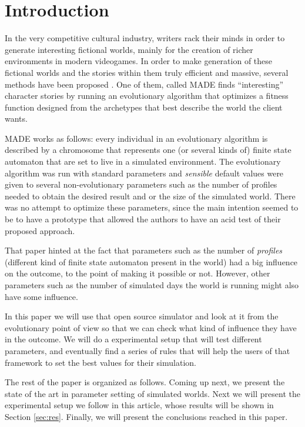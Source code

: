 \documentclass[runningheads,a4paper]{llncs}
\begin{document}
\section{Introduction}

In the very competitive cultural industry, writers rack their minds in
order to generate interesting fictional worlds, mainly for the
creation of richer environments in modern videogames. In order to make
generation of these fictional worlds and the stories within them truly efficient and massive,
several methods have been proposed \cite{garcia14my,nairat:evolution}. One of them, called MADE
\cite{garcia14my} finds ``interesting'' character stories by running
an evolutionary algorithm that optimizes a fitness function designed
from the archetypes that best describe the world the client wants.

MADE works as follows: every individual in an evolutionary algorithm
is described by a chromosome that represents one (or several kinds of)
finite state automaton that are set to live in a simulated
environment. The evolutionary algorithm was run with standard
parameters and {\em sensible} default values were given to several
non-evolutionary parameters such as the number of profiles needed to
obtain the desired result and or the size of the simulated
world. There was no attempt to optimize these parameters, since the
main intention seemed to be to have a prototype that allowed the
authors to have an acid test of their proposed approach.

That paper hinted at the fact that parameters such as the number of
{\em profiles} (different kind of finite state automaton present in
the world) had a big influence on the outcome, to the point of making
it possible or not. However, other parameters such as the number of
simulated days the world is running might also have some influence.

In this paper we will use that open source simulator and look at it
from the evolutionary point of view so that we can check what kind of
influence they have in the outcome. We will do a experimental setup
that will test different parameters, and eventually find a series of
rules that will help the users of that framework to set the best
values for their simulation. 

The rest of the paper is organized as follows. Coming up next, we
present the state of the art in parameter setting of simulated
worlds. Next we will present the experimental setup we follow in this
article, whose results will be shown in Section \ref{sec:res}. Finally, we will
present the conclusions reached in this paper.
\end{document}
